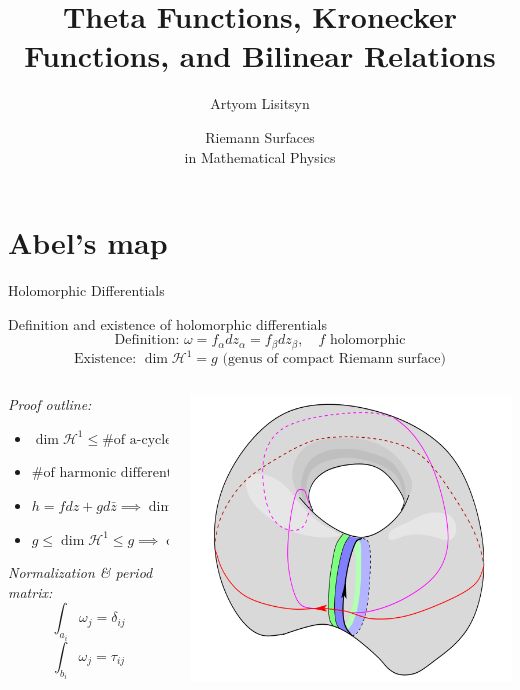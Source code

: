 \documentclass[11pt,aspectratio=169]{beamer}
\title{Theta Functions, Kronecker Functions, and Bilinear Relations}
\date[2023]{Riemann Surfaces \\ in Mathematical Physics}
\author{Artyom Lisitsyn}
\institute{D-PHYS}
\begin{document}
\def\titlefigure{assets/ThetaBigMonoCrop.png}
\titleframe{}

\tocframe{}

\section{Abel's map}

\begin{frame}{Holomorphic Differentials}
    \begin{block}{Definition and existence of holomorphic differentials}
        \vspace{-1em}
        \[\text{Definition: } \omega = f_\alpha dz_\alpha = f_\beta dz_\beta , \quad f \text{ holomorphic}\]
        \[\text{Existence: } \dim \mathcal H^1 = g \text{ (genus of compact Riemann surface)}\]
    \end{block}

    \begin{columns}[onlytextwidth]
        \begin{column}{0.55\textwidth}
            \emph{Proof outline:}
            \begin{itemize}
                \item $\dim \mathcal H^1 \leq \text{\# of a-cycles} = g$
                \item $\text{\# of harmonic differentials} = \dim H \geq 2g$
                \item $h = f dz + g d \bar z \implies \dim H = 2 \dim \mathcal H^1$
                \item $g \leq \dim \mathcal H^1 \leq g \implies \dim \mathcal H^1 = g$
            \end{itemize}
            \emph{Normalization \& period matrix:}
            \[ \int_{a_i} \omega_j = \delta_{ij} \]
            \[ \int_{b_i} \omega_j = \tau_{ij} \]
        \end{column}
        \begin{column}{0.45\textwidth}
            \center{}
            \includegraphics[width=0.8\columnwidth]{assets/HarmonicDifferential.png}
            

\end{column}
\end{columns}
\end{frame}
\end{document}
